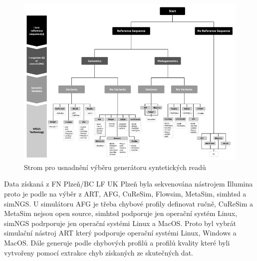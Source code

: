 \documentclass[czech,DP]{thesiskiv}
\numberwithin{equation}{section}
\begin{document}
\begin{figure}[H]		
		\centering
		\includegraphics[width=1\textwidth]{./img/read_simulators.jpg}
		\caption{Strom pro usnadnění výběru generátoru syntetických readů \cite{simulation_read}}
		\label{fig:read_simulators}
\end{figure}

\noindent
Data získaná z FN Plzeň/BC LF UK Plzeň byla sekvenována nástrojem Illumina proto je podle \cite{simulation_read} na výběr z ART, AFG, CuReSim, Flowsim, MetaSim, simhtsd a simNGS. U simulátoru AFG je třeba chybové profily definovat ručně, CuReSim a MetaSim nejsou open source, simhtsd podporuje jen operační systém Linux, simNGS podrporuje jen operační systémi Linux a MacOS. Proto byl vybrát simulační nástroj ART který podporuje operační systémi Linux, Windows a MacOS. Dále generuje podle chybových profilů a profilů kvality které byli vytvořeny pomocí extrakce chyb získaných ze skutečných dat. 
\end{document}

